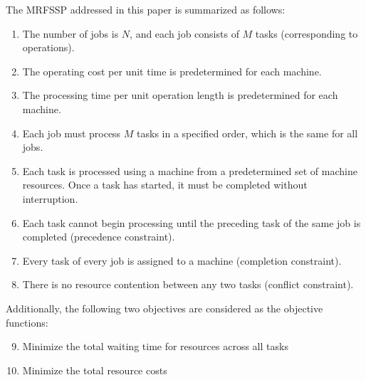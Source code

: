 \documentclass[conference]{IEEEtran}
\begin{document}
The MRFSSP addressed in this paper is summarized as follows:

\begin{enumerate} 
\item The number of jobs is $N$, and each job consists of $M$ tasks (corresponding to operations). 
\item The operating cost per unit time is predetermined for each machine. 
\item The processing time per unit operation length is predetermined for each machine. 
\item Each job must process $M$ tasks in a specified order, which is the same for all jobs. 
\item Each task is processed using a machine from a predetermined set of machine resources. Once a task has started, it must be completed without interruption. 
\item Each task cannot begin processing until the preceding task of the same job is completed (precedence constraint). 
\item Every task of every job is assigned to a machine (completion constraint). 
\item There is no resource contention between any two tasks (conflict constraint).
 \end{enumerate}
 
Additionally, the following two objectives are considered as the objective functions:

\begin{enumerate} 
\setcounter{enumi}{8} 
\item Minimize the total waiting time for resources across all tasks
\item Minimize the total resource costs
\end{enumerate}





%
\end{document}
